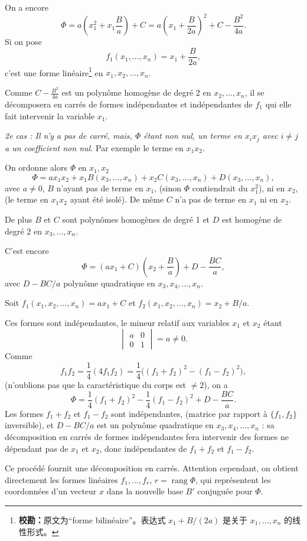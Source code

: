 On a encore
\[
\Phi=a\left(x_1^2+x_1\frac Ba\right)+C
=a\left(x_1+\frac{B}{2a}\right)^2+C-\frac{B^2}{4a}.
\]
Si on pose
\[
f_1(x_1,\ldots,x_n)=x_1+\frac{B}{2a},
\]
c'est une forme linéaire\footnote{\textbf{校勘：}原文为“forme bilinéaire”。表达式 $x_1+B/(2a)$ 是关于 $x_1,\ldots,x_n$ 的线性形式。} en $x_1,x_2,\ldots,x_n$.

Comme $C-\frac{B^2}{4a}$ est un polynôme homogène de degré 2 en $x_2,\ldots,x_n$, il se décomposera en carrés de formes indépendantes et indépendantes de $f_1$ qui elle fait intervenir la variable $x_1$.

\emph{2e cas : Il n'y a pas de carré, mais, $\Phi$ étant non nul, un terme en $x_ix_j$ avec $i\ne j$ a un coefficient non nul.} Par exemple le terme en $x_1x_2$.

On ordonne alors $\Phi$ en $x_1,x_2$
\[
\Phi=ax_1x_2+x_1B(x_3,\ldots,x_n)+x_2C(x_3,\ldots,x_n)+D(x_3,\ldots,x_n),
\]
avec $a\ne0$, $B$ n'ayant pas de terme en $x_1$, (sinon $\Phi$ contiendrait du $x_1^2$), ni en $x_2$, (le terme en $x_1x_2$ ayant été isolé). De même $C$ n'a pas de terme en $x_1$ ni en $x_2$.

De plus $B$ et $C$ sont polynômes homogènes de degré 1 et $D$ est homogène de degré 2 en $x_3,\ldots,x_n$.

C'est encore
\[
\Phi=(ax_1+C)\left(x_2+\frac Ba\right)+D-\frac{BC}{a},
\]
avec $D-BC/a$ polynôme quadratique en $x_3,x_4,\ldots,x_n$.

Soit $f_1(x_1,x_2,\ldots,x_n)=ax_1+C$ et $f_2(x_1,x_2,\ldots,x_n)=x_2+B/a$.

Ces formes sont indépendantes, le mineur relatif aux variables $x_1$ et $x_2$ étant
\[
\begin{vmatrix}a&0\\0&1\end{vmatrix}=a\ne0.
\]
Comme
\[
f_1f_2=\frac14(4f_1f_2)=\frac14\bigl((f_1+f_2)^2-(f_1-f_2)^2\bigr),
\]
(n'oublions pas que la caractéristique du corps est $\ne2$), on a
\[
\Phi=\frac14(f_1+f_2)^2-\frac14(f_1-f_2)^2+D-\frac{BC}{a}.
\]
Les formes $f_1+f_2$ et $f_1-f_2$ sont indépendantes, (matrice par rapport à $\{f_1,f_2\}$ inversible), et $D-BC/a$ est un polynôme quadratique en $x_3,x_4,\ldots,x_n$ : sa décomposition en carrés de formes indépendantes fera intervenir des formes ne dépendant pas de $x_1$ et $x_2$, donc indépendantes de $f_1+f_2$ et $f_1-f_2$.

Ce procédé fournit une décomposition en carrés. Attention cependant, on obtient directement les formes linéaires $f_1,\ldots,f_r$, $r=\operatorname{rang}\Phi$, qui représentent les coordonnées d'un vecteur $x$ dans la nouvelle base $B'$ conjuguée pour $\Phi$.

